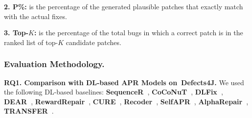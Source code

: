 {\bf 2. P\%:} is the percentage of the generated plausible patches
that exactly match with the actual fixes.

{\bf 3. Top-$K$:} is the percentage of the total bugs in which a correct
patch is in the ranked list of top-$K$ candidate patches.

\subsubsection{Evaluation Methodology.\\}

{\bf RQ1. Comparison with DL-based APR Models on~Defects4J.}  We used
the following DL-based baselines: {\bf
  SequenceR~\cite{chen2018sequencer}}, {\bf
  CoCoNuT~\cite{lutellier2020coconut}}, {\bf DLFix~\cite{icse20}},
{\bf DEAR~\cite{icse22}}, {\bf RewardRepair~\cite{monperrus-icse22}},
{\bf CURE~\cite{cure-icse21}}, {\bf Recoder~\cite{recoder-fse21}},
{\bf SelfAPR~\cite{ye2022selfapr}}, {\bf AlphaRepair~\cite{xia2022less}}, 
{\bf TRANSFER~\cite{meng2022improving}}.







